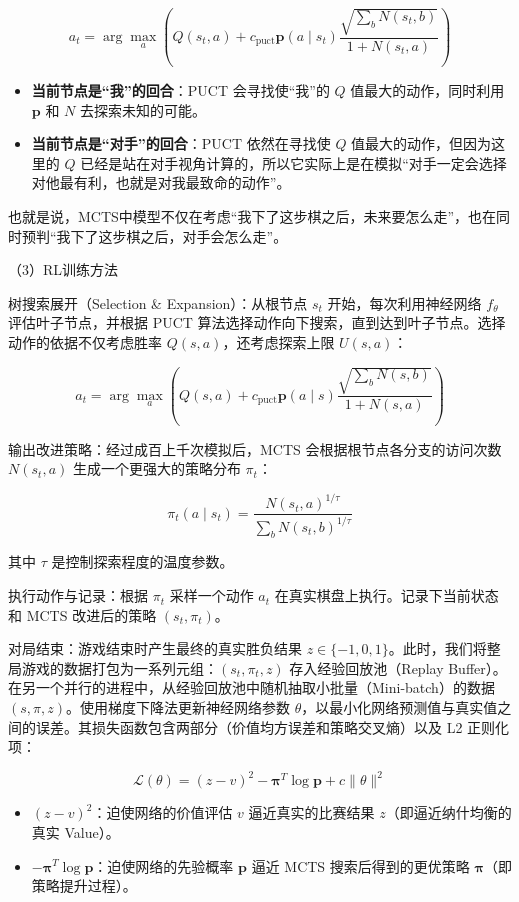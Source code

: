 \[
a_t=\arg\max_a\left(Q(s_t,a)+c_{\mathrm{puct}}\mathbf{p}(a\mid s_t)\frac{\sqrt{\sum_b N(s_t,b)}}{1+N(s_t,a)}\right)
\]

\begin{itemize}
\tightlist
\item
  \textbf{当前节点是``我''的回合}：PUCT 会寻找使``我''的 \(Q\) 值最大的动作，同时利用 \(\mathbf{p}\) 和 \(N\) 去探索未知的可能。
\item
  \textbf{当前节点是``对手''的回合}：PUCT 依然在寻找使 \(Q\) 值最大的动作，但因为这里的 \(Q\) 已经是站在对手视角计算的，所以它实际上是在模拟``对手一定会选择对他最有利，也就是对我最致命的动作''。
\end{itemize}

也就是说，MCTS中模型不仅在考虑``我下了这步棋之后，未来要怎么走''，也在同时预判``我下了这步棋之后，对手会怎么走''。

（3）RL训练方法

树搜索展开（Selection \& Expansion）：从根节点 \(s_t\) 开始，每次利用神经网络 \(f_\theta\) 评估叶子节点，并根据 PUCT 算法选择动作向下搜索，直到达到叶子节点。选择动作的依据不仅考虑胜率 \(Q(s,a)\)，还考虑探索上限 \(U(s,a)\)：

\[
a_t=\arg\max_a\left(Q(s,a)+c_{\mathrm{puct}}\mathbf{p}(a\mid s)\frac{\sqrt{\sum_b N(s,b)}}{1+N(s,a)}\right)
\]

输出改进策略：经过成百上千次模拟后，MCTS 会根据根节点各分支的访问次数 \(N(s_t,a)\) 生成一个更强大的策略分布 \(\pi_t\)：

\[
\pi_t(a\mid s_t)=\frac{N(s_t,a)^{1/\tau}}{\sum_b N(s_t,b)^{1/\tau}}
\]

其中 \(\tau\) 是控制探索程度的温度参数。

执行动作与记录：根据 \(\pi_t\) 采样一个动作 \(a_t\) 在真实棋盘上执行。记录下当前状态和 MCTS 改进后的策略 \((s_t,\pi_t)\)。

对局结束：游戏结束时产生最终的真实胜负结果 \(z\in\{-1,0,1\}\)。此时，我们将整局游戏的数据打包为一系列元组：\((s_t,\pi_t,z)\) 存入经验回放池（Replay Buffer）。在另一个并行的进程中，从经验回放池中随机抽取小批量（Mini-batch）的数据 \((s,\pi,z)\)。使用梯度下降法更新神经网络参数 \(\theta\)，以最小化网络预测值与真实值之间的误差。其损失函数包含两部分（价值均方误差和策略交叉熵）以及 L2 正则化项：

\[
\mathcal{L}(\theta)=(z-v)^2-\boldsymbol{\pi}^{T}\log\mathbf{p}+c\lVert\theta\rVert^2
\]

\begin{itemize}
\tightlist
\item
  \((z-v)^2\)：迫使网络的价值评估 \(v\) 逼近真实的比赛结果 \(z\)（即逼近纳什均衡的真实 Value）。
\item
  \(-\boldsymbol{\pi}^{T}\log\mathbf{p}\)：迫使网络的先验概率 \(\mathbf{p}\) 逼近 MCTS 搜索后得到的更优策略 \(\boldsymbol{\pi}\)（即策略提升过程）。
\end{itemize}

